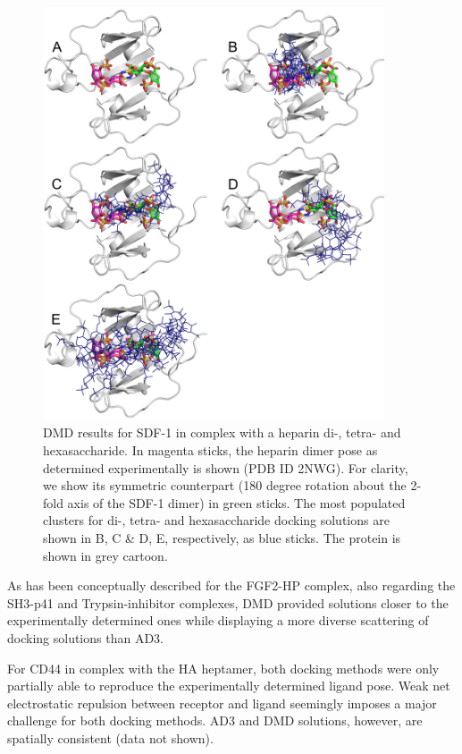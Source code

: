 \begin{figure}
\centering
\includegraphics[width=0.9\textwidth]{gfx/dmd/suppl/suppl_sdf1_dmd_he-2-4-6.png}
\caption[]{
DMD results for SDF-1 in complex with a heparin di-, tetra- and hexasaccharide.
In magenta sticks, the heparin dimer pose as determined experimentally is shown
(PDB ID 2NWG). For clarity, we show its symmetric counterpart (180 degree
rotation about the 2-fold axis of the SDF-1 dimer) in green sticks. The most
populated clusters for di-, tetra- and hexasaccharide docking solutions are
shown in B, C \& D, E, respectively, as blue sticks. The protein is shown in
grey cartoon.
}
\label{fig:dmd:sdf1_hp_246}
\end{figure}


As has been conceptually described for the FGF2-HP complex, also regarding the
SH3-p41 and Trypsin-inhibitor complexes, DMD provided solutions closer to the
experimentally determined ones while displaying a more diverse scattering of
docking solutions than AD3.

For CD44 in complex with the HA heptamer, both docking methods were only
partially able to reproduce the experimentally determined ligand pose. Weak net
electrostatic repulsion between receptor and ligand seemingly imposes a major
challenge for both docking methods. AD3 and DMD solutions, however, are
spatially consistent (data not shown).


